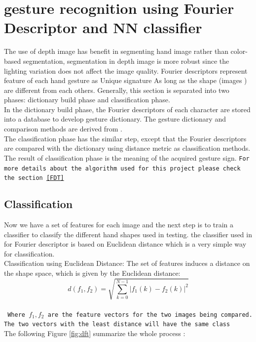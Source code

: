 
\section{gesture recognition using Fourier Descriptor and NN  classifier }

 The use of depth image has benefit
in segmenting hand image rather than color-based
segmentation, segmentation in depth image is more robust
since the lighting variation does not affect the image quality.
 Fourier descriptors represent feature of each hand gesture as Unique signature As long as the shape (images ) are different from each others.
Generally, this section is separated into two phases:
dictionary build phase and classification phase. \\In the
dictionary build phase, the Fourier descriptors of each
character are stored into a database to develop gesture
dictionary. The gesture dictionary and comparison methods are
derived from \cite{clif}.\\ The classification phase has the similar
step, except that the Fourier descriptors are compared with the
dictionary using distance metric as classification methods.
The result of classification phase is the meaning of the
acquired gesture sign.
\texttt{For more details about the algorithm used for this project please check the section \ref{FDT}
}

\subsection{Classification }
Now we have a set of features for each image and the next
step is to train a classifier to classify the different hand shapes
used in testing. the classifier used in for Fourier descriptor is based on Euclidean distance which is a very simple way for
classification.\\
Classification using Euclidean Distance: The set of
features induces a distance on the shape space, which is given
by the Euclidean distance: 
$$d(f_{1},f_{2}) = \sqrt{\sum_{k=0}^{N-1} |f_{1}(k)-f_{2}(k)|^{2}}$$\\
\texttt{ Where $f_{1},f_{2}$ are the feature vectors for the two images being
compared. The two vectors with the least distance will have
the same class}\\

The following Figure \ref{fig:dft} summarize the whole process :  
        
